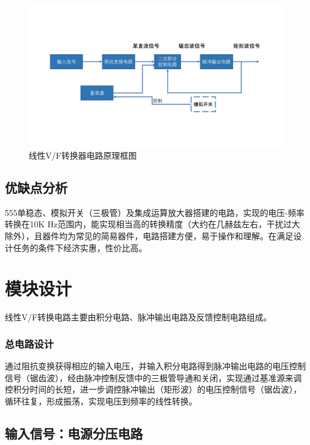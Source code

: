 \documentclass[12pt]{article}
\begin{document}
\begin{figure}[htbp]
    \centering
    \includegraphics[width=1\textwidth]{fig/flow.jpg}
    \caption{线性V/F转换器电路原理框图}
    \label{fig:flow}
\end{figure}

\subsection{优缺点分析}

555单稳态、模拟开关（三极管）及集成运算放大器搭建的电路，实现的电压-频率转换在10K Hz范围内，能实现相当高的转换精度（大约在几赫兹左右，干扰过大除外），且器件均为常见的简易器件，电路搭建方便，易于操作和理解。在满足设计任务的条件下经济实惠，性价比高。

\section{模块设计}

线性V/F转换电路主要由积分电路、脉冲输出电路及反馈控制电路组成。

\subsubsection*{总电路设计}

通过阻抗变换获得相应的输入电压，并输入积分电路得到脉冲输出电路的电压控制信号（锯齿波），经由脉冲控制反馈中的三极管导通和关闭，实现通过基准源来调控积分时间的长短，进一步调控脉冲输出（矩形波）的电压控制信号（锯齿波），循环往复，形成振荡，实现电压到频率的线性转换。

\subsection{输入信号：电源分压电路}
\end{document}
